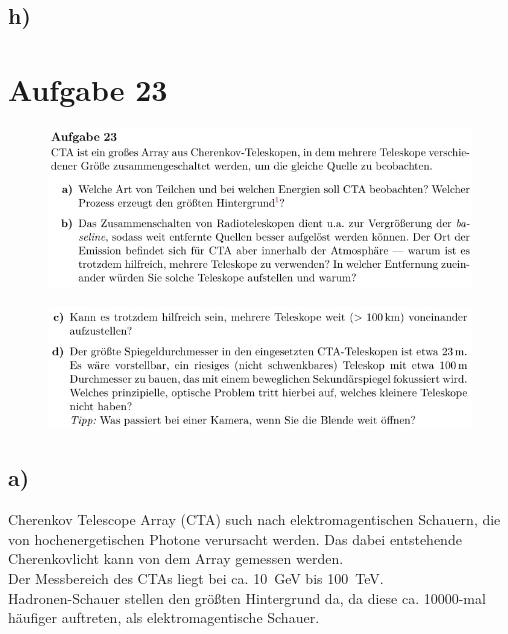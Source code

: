 \subsection{h)}

\section{Aufgabe 23}

    \begin{figure}[H]
        \centering
        \includegraphics[width=\textwidth]{images/Aufgabe23a.jpg}
        \label{fig:3}
    \end{figure}

    \begin{figure}[H]
        \centering
        \includegraphics[width=\textwidth]{images/Aufgabe23b.jpg}
        \label{fig:4}
    \end{figure}

\subsection{a)}

    \justifying Cherenkov Telescope Array (CTA) such nach elektromagentischen Schauern, die von hochenergetischen
    Photone verursacht werden. Das dabei entstehende Cherenkovlicht kann von dem Array gemessen werden.\\
    Der Messbereich des CTAs liegt bei ca. \SI{10}{\giga\electronvolt} bis \SI{100}{\tera\electronvolt}.\\
    Hadronen-Schauer stellen den größten Hintergrund da, da diese ca. 10000-mal häufiger auftreten, als 
    elektromagentische Schauer.

